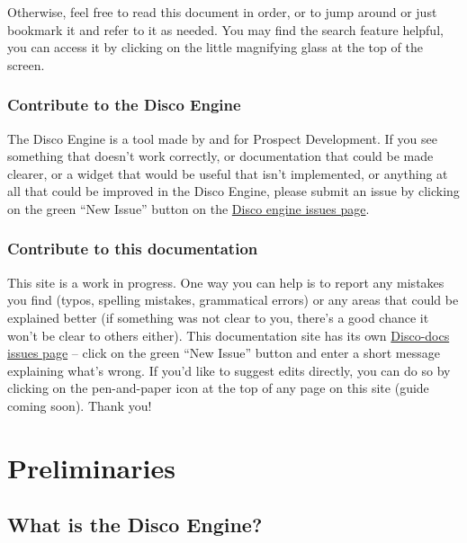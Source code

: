 \documentclass[]{book}
\begin{document}
Otherwise, feel free to read this document in order, or to jump around or just bookmark it and refer to it as needed. You may find the search feature helpful, you can access it by clicking on the little magnifying glass at the top of the screen.

\hypertarget{contribute-to-the-disco-engine}{%
\section{Contribute to the Disco Engine}\label{contribute-to-the-disco-engine}}

The Disco Engine is a tool made by and for Prospect Development. If you see something that doesn't work correctly, or documentation that could be made clearer, or a widget that would be useful that isn't implemented, or anything at all that could be improved in the Disco Engine, please submit an issue by clicking on the green ``New Issue'' button on the \href{https://github.com/tarakc02/discoveryengine/issues}{Disco engine issues page}.

\hypertarget{contribute-to-this-documentation}{%
\section{Contribute to this documentation}\label{contribute-to-this-documentation}}

This site is a work in progress. One way you can help is to report any mistakes you find (typos, spelling mistakes, grammatical errors) or any areas that could be explained better (if something was not clear to you, there's a good chance it won't be clear to others either). This documentation site has its own \href{https://github.com/tarakc02/discodocs/issues}{Disco-docs issues page} -- click on the green ``New Issue'' button and enter a short message explaining what's wrong. If you'd like to suggest edits directly, you can do so by clicking on the pen-and-paper icon at the top of any page on this site (guide coming soon). Thank you!

\hypertarget{part-preliminaries}{%
\part{Preliminaries}\label{part-preliminaries}}

\hypertarget{what-is-disco}{%
\chapter{What is the Disco Engine?}\label{what-is-disco}}
\end{document}

